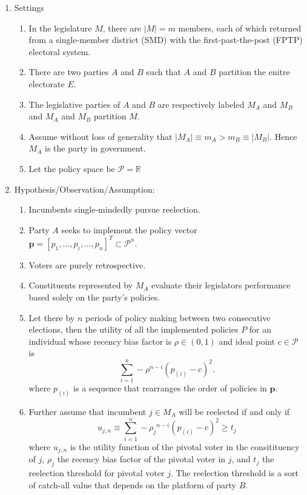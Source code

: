 \documentclass[hyphens, crop=false]{standalone}
\begin{document}
	\begin{enumerate}
		\item 
		Settings
		\begin{enumerate}
			\item 
			In the legislature $M$, there are $|M|  = m$ members, each of which returned from a single-member district (SMD) with the first-past-the-post (FPTP) electoral system.
			\item 
			There are two parties $A$ and $B$
			such that $A$ and $B$ partition the enitre electorate $E$.
			\item 
			The legislative parties of $A$ and $B$
			are respectively labeled $M_A$ and $M_B$ and $M_A$ and $M_B$ partition $M$.
			\item 
			Assume without loss of generality that $|M_A| \equiv m_A > m_B\equiv |M_B|$. Hence
			$M_A$ is the party in government.
			\item 
			Let the policy space be $\mathcal{P} = \mathbb{R}$
		\end{enumerate}
		\item 
		Hypothesis/Observation/Assumption:
		\begin{enumerate}
			\item 
			Incumbents single-mindedly pursue reelection.
			\item 
			Party $A$ seeks to implement the policy vector $\textbf{p} = [p_1, \dots, p_i, \dots, p_n]^T\subset \mathcal{P}^n$.
			\item 
			Voters are purely retrospective. 
			\item 
			Constituents represented by $M_A$
			evaluate their legislators performance
			based solely on the party's policies.
			\item 
			Let there by $n$ periods of policy making between two consecutive elections, then the utility of all the implemented policies $P$ for an individual whose recency bias factor is $\rho \in (0, 1)$ and ideal point $c\in \mathcal{P}$ is
			$$
			\sum_{i = 1}^{n} -\rho^{n-i}( p_{(i)}-c)^2.
			$$
			where $p_{(i)}$ is a sequence that rearranges the order of policies in $\mathbf{p}$.
			\item 
			Further assume that incumbent $j\in M_A$ will be reelected if and only if 
			$$
			u_{j, n} \equiv \sum_{i = 1}^{n} -{\rho_j}^{n-i}( p_{(i)}-c)^2 \geq t_j 
			$$
			where 
			$u_{j,n}$
			is the utility function of the pivotal voter in the consitituency of $j$,
			$\rho_j$ the recency bias factor of the pivotal voter in $j$,
			and
			$t_j$
			the reelection threshold for pivotal voter $j$. The reelection threshold is a sort of catch-all value that depends on the platform of party $B$.
		\end{enumerate}
		

\end{enumerate}
\end{document}
